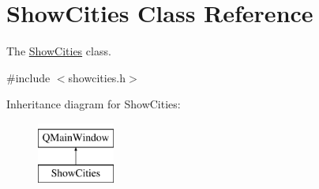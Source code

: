 \hypertarget{class_show_cities}{}\section{Show\+Cities Class Reference}
\label{class_show_cities}


The \hyperlink{class_show_cities}{Show\+Cities} class.  




{\ttfamily \#include $<$showcities.\+h$>$}

Inheritance diagram for Show\+Cities\+:\begin{figure}[H]
\begin{center}
\leavevmode
\includegraphics[height=2.000000cm]{class_show_cities}
\end{center}
\end{figure}

